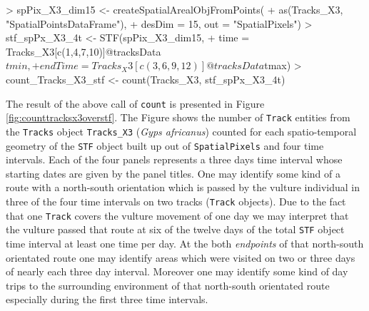 \documentclass[12pt, oneside, a4paper]{scrbook}
\let\code=\texttt
\begin{document}
\par\medskip

\begin{small}
\begin{Schunk}
\begin{Sinput}
> spPix_X3_dim15 <- createSpatialArealObjFromPoints(
+   as(Tracks_X3, "SpatialPointsDataFrame"), 
+   desDim = 15, out = "SpatialPixels")
> stf_spPx_X3_4t <- STF(spPix_X3_dim15,
+                       time = Tracks_X3[c(1,4,7,10)]@tracksData$tmin,
+                       endTime = Tracks_X3[c(3,6,9,12)]@tracksData$tmax)
> count_Tracks_X3_stf <- count(Tracks_X3, stf_spPx_X3_4t)
\end{Sinput}
\end{Schunk}
\end{small}

\par\medskip

The result of the above call of \code{count} is presented in Figure \ref{fig:counttracksx3overstf}.
The Figure shows the number of \code{Track} entities from the \code{Tracks} object \code{Tracks\_X3} (\textit{Gyps africanus}) counted for each spatio-temporal geometry of the \code{STF} object built up out of \code{SpatialPixels} and four time intervals. Each of the four panels represents a three days time interval whose starting dates are given by the panel titles. One may identify some kind of a route with a north-south orientation which is passed by the vulture individual in three of the four time intervals on two tracks (\code{Track} objects). Due to the fact that one \code{Track} covers the vulture movement of one day we may interpret that the vulture passed that route at six of the twelve days of the total \code{STF} object time interval at least one time per day. At the both \textit{endpoints} of that north-south orientated route one may identify areas which were visited on two or three days of nearly each three day interval. Moreover one may identify some kind of day trips to the surrounding environment of that north-south orientated route especially during the first three time intervals.

\par\medskip
\end{document}
